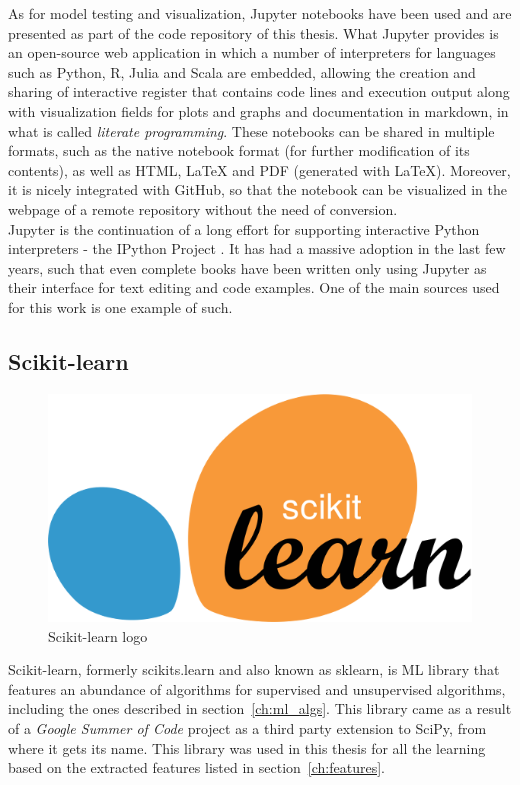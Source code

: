 As for model testing and visualization, Jupyter notebooks \cite{Jupyter} have been used and are presented as part of the code repository of this thesis. What Jupyter provides is an open-source web application in which a number of interpreters for languages such as Python, R, Julia and Scala are embedded, allowing the creation and sharing of interactive register that contains code lines and execution output along with visualization fields for plots and graphs and documentation in markdown, in what is called \emph{literate programming}. These notebooks can be shared in multiple formats, such as the native notebook format (for further modification of its contents), as well as HTML, \LaTeX{} and PDF (generated with \LaTeX). Moreover, it is nicely integrated with GitHub, so that the notebook can be visualized in the webpage of a remote repository without the need of conversion.\\

Jupyter is the continuation of a long effort for supporting interactive Python interpreters - the IPython Project \cite{IPython}. It has had a massive adoption in the last few years, such that even complete books have been written only using Jupyter as their interface for text editing and code examples. One of the main sources used for this work \cite{Andreas} is one example of such.

\subsection{Scikit-learn}
\begin{figure}[!ht]
    \centering
    \includegraphics[width=0.4\linewidth]{figures/sklearn_logo}
    \caption{Scikit-learn logo}
    \label{fig:sklearn_logo}
\end{figure}
Scikit-learn, formerly scikits.learn and also known as sklearn, is \ac{ML} library that features an abundance of algorithms for supervised and unsupervised algorithms, including the ones described in section~\ref{ch:ml_algs}. This library came as a result of a \emph{Google Summer of Code} project as a third party extension to SciPy, from where it gets its name. This library was used in this thesis for all the learning based on the extracted features listed in section~\ref{ch:features}.

